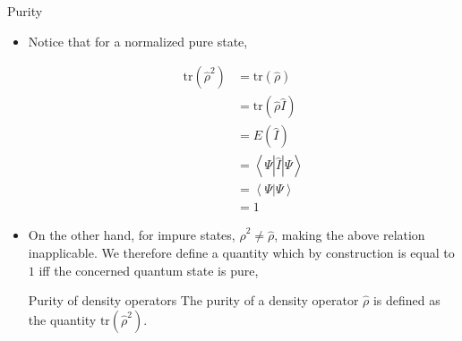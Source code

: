 \documentclass[9pt,handout]{beamer}
\newcommand{\tr}[0]{\text{tr}}
\begin{document}
\begin{frame}{Purity}
\begin{itemize}
\item Notice that for a normalized pure state,

\begin{align*}
\tr \left( \widehat{\rho}^2 \right) & = \tr \left( \widehat{\rho} \right) \\
& = \tr \left( \widehat{\rho} \widehat{I} \right) \\
& = E \left( \widehat{I} \right) \\
& = \left\langle \Psi \left\lvert \widehat{I} \right\rvert \Psi \right\rangle \\
& = \left\langle \Psi \right\rvert \left. \Psi \right\rangle \\
& = 1
\end{align*}

\item On the other hand, for impure states, $\widehat{\rho}^2 \neq \widehat{\rho}$, making the above relation inapplicable. We therefore define a quantity which by construction is equal to $1$ iff the concerned quantum state is pure,

\begin{block}{Purity of density operators}
The purity of a density operator $\widehat{\rho}$ is defined as the quantity $\tr \left( \widehat{\rho}^2 \right)$.
\end{block}
\end{itemize}
\end{frame}
\end{document}
